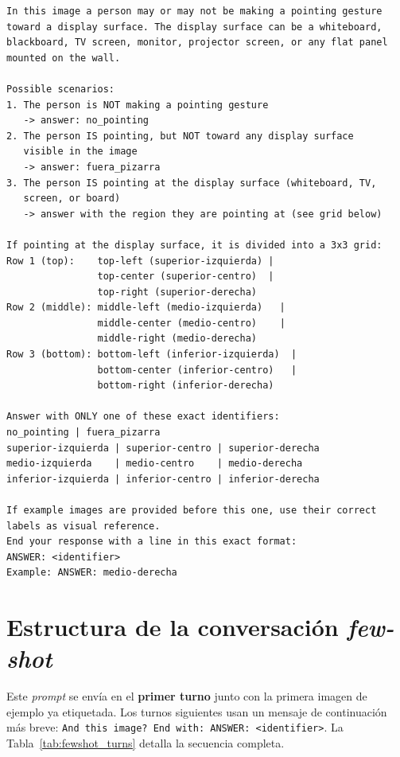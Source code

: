 \documentclass[12pt]{report} %
\begin{document}
\begin{lstlisting}[numbers=none, basicstyle=\ttfamily\footnotesize, breaklines=true]
In this image a person may or may not be making a pointing gesture
toward a display surface. The display surface can be a whiteboard,
blackboard, TV screen, monitor, projector screen, or any flat panel
mounted on the wall.

Possible scenarios:
1. The person is NOT making a pointing gesture
   -> answer: no_pointing
2. The person IS pointing, but NOT toward any display surface
   visible in the image
   -> answer: fuera_pizarra
3. The person IS pointing at the display surface (whiteboard, TV,
   screen, or board)
   -> answer with the region they are pointing at (see grid below)

If pointing at the display surface, it is divided into a 3x3 grid:
Row 1 (top):    top-left (superior-izquierda) |
                top-center (superior-centro)  |
                top-right (superior-derecha)
Row 2 (middle): middle-left (medio-izquierda)   |
                middle-center (medio-centro)    |
                middle-right (medio-derecha)
Row 3 (bottom): bottom-left (inferior-izquierda)  |
                bottom-center (inferior-centro)   |
                bottom-right (inferior-derecha)

Answer with ONLY one of these exact identifiers:
no_pointing | fuera_pizarra
superior-izquierda | superior-centro | superior-derecha
medio-izquierda    | medio-centro    | medio-derecha
inferior-izquierda | inferior-centro | inferior-derecha

If example images are provided before this one, use their correct
labels as visual reference.
End your response with a line in this exact format:
ANSWER: <identifier>
Example: ANSWER: medio-derecha
\end{lstlisting}

\section{Estructura de la conversación \textit{few-shot}}
\label{sec:fewshot_estructura}

Este \textit{prompt} se envía en el \textbf{primer turno} junto con la primera imagen de ejemplo ya etiquetada. Los turnos siguientes usan un mensaje de continuación más breve: \texttt{And this image? End with: ANSWER: <identifier>}. La Tabla~\ref{tab:fewshot_turns} detalla la secuencia completa.
\end{document}
